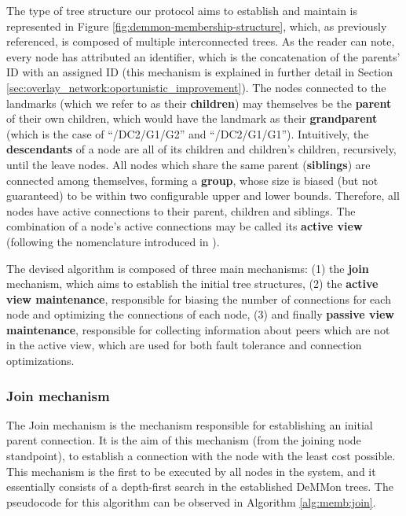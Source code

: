 The type of tree structure our protocol aims to establish and maintain is represented in Figure \ref{fig:demmon-membership-structure}, which, as previously referenced, is composed of multiple interconnected trees. As the reader can note, every node has attributed an identifier, which is the concatenation of the parents' ID with an assigned ID (this mechanism is explained in further detail in Section \ref{sec:overlay_network:oportunistic_improvement}). The nodes connected to the landmarks (which we refer to as their \textbf{children}) may themselves be the \textbf{parent} of their own children, which would have the landmark as their \textbf{grandparent} (which is the case of ``/DC2/G1/G2'' and ``/DC2/G1/G1''). Intuitively, the \textbf{descendants} of a node are all of its children and children's children, recursively, until the leave nodes. All nodes which share the same parent (\textbf{siblings}) are connected among themselves, forming a \textbf{group}, whose size is biased (but not guaranteed) to be within two configurable upper and lower bounds. Therefore, all nodes have active connections to their parent, children and siblings. The combination of a node's active connections may be called its \textbf{active view} (following the nomenclature introduced in \cite{Hyparview}). 

The devised algorithm is composed of three main mechanisms: (1) the \textbf{join} mechanism, which aims to establish the initial tree structures, (2) the \textbf{active view maintenance}, responsible for biasing the number of connections for each node and optimizing the connections of each node, (3)  and finally \textbf{passive view maintenance}, responsible for collecting information about peers which are not in the active view, which are used for both fault tolerance and connection optimizations.

\subsubsection{Join mechanism} \label{sec:overlay_network:join}

The Join mechanism is the mechanism responsible for establishing an initial parent connection. It is the aim of this mechanism (from the joining node standpoint), to establish a connection with the node with the least cost possible. This mechanism is the first to be executed by all nodes in the system, and it essentially consists of a depth-first search in the established DeMMon trees. The pseudocode for this algorithm can be observed in Algorithm \ref{alg:memb:join}. 


